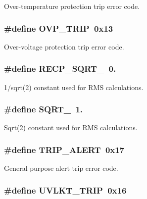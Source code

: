 Over-\/temperature protection trip error code. \hypertarget{a00043_ac330c784fd08c389f8649ac8e34d29e8}{
\subsubsection[{O\-V\-P\-\_\-\-T\-R\-I\-P}]{\setlength{\rightskip}{0pt plus 5cm}\#define O\-V\-P\-\_\-\-T\-R\-I\-P~0x13}}\label{a00043_ac330c784fd08c389f8649ac8e34d29e8}
Over-\/voltage protection trip error code. \hypertarget{a00043_ae468f418f2e6410dfcfeb58bcbbde516}{
\subsubsection[{R\-E\-C\-P\-\_\-\-S\-Q\-R\-T\-\_\-2}]{\setlength{\rightskip}{0pt plus 5cm}\#define R\-E\-C\-P\-\_\-\-S\-Q\-R\-T\-\_~0.}}\label{a00043_ae468f418f2e6410dfcfeb58bcbbde516}
1/sqrt(2) constant used for R\-M\-S calculations. \hypertarget{a00043_abc63ab2a8e7782de38a5dbdfc33da717}{
\subsubsection[{S\-Q\-R\-T\-\_\-2}]{\setlength{\rightskip}{0pt plus 5cm}\#define S\-Q\-R\-T\-\_~1.}}\label{a00043_abc63ab2a8e7782de38a5dbdfc33da717}
Sqrt(2) constant used for R\-M\-S calculations. \hypertarget{a00043_a374b2278b7b71964ac3b08778e1f9f26}{
\subsubsection[{T\-R\-I\-P\-\_\-\-A\-L\-E\-R\-T}]{\setlength{\rightskip}{0pt plus 5cm}\#define T\-R\-I\-P\-\_\-\-A\-L\-E\-R\-T~0x17}}\label{a00043_a374b2278b7b71964ac3b08778e1f9f26}
General purpose alert trip error code. \hypertarget{a00043_a51b770c08a5aa53779faa10653b095a0}{
\subsubsection[{U\-V\-L\-K\-T\-\_\-\-T\-R\-I\-P}]{\setlength{\rightskip}{0pt plus 5cm}\#define U\-V\-L\-K\-T\-\_\-\-T\-R\-I\-P~0x16}}\label{a00043_a51b770c08a5aa53779faa10653b095a0}
